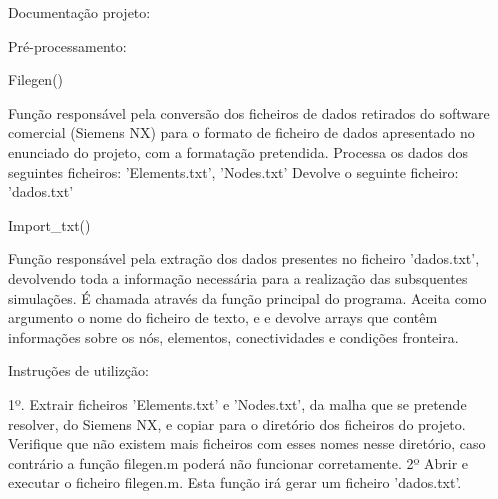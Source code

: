 \documentclass{article}
\begin{document}
Documentação projeto:

Pré-processamento:

Filegen()

    Função responsável pela conversão dos ficheiros de dados retirados do software comercial (Siemens NX) 
    para o formato de ficheiro de dados apresentado no enunciado do projeto, com a formatação pretendida.
    Processa os dados dos seguintes ficheiros: 'Elements.txt', 'Nodes.txt'
    Devolve o seguinte ficheiro: 'dados.txt'

Import_txt()

    Função responsável pela extração dos dados presentes no ficheiro 'dados.txt', devolvendo toda a informação
    necessária para a realização das subsquentes simulações.
    É chamada através da função principal do programa. Aceita como argumento o nome do ficheiro de texto, e
    e devolve arrays que contêm informações sobre os nós, elementos, conectividades e condições fronteira.



Instruções de utilizção:

    1º. Extrair ficheiros 'Elements.txt' e 'Nodes.txt', da malha que se pretende resolver, do Siemens NX, e 
    copiar para o diretório dos ficheiros do projeto. Verifique que não existem mais ficheiros com esses nomes
    nesse diretório, caso contrário a função filegen.m poderá não funcionar corretamente.
    2º Abrir e executar o ficheiro filegen.m. Esta função irá gerar um ficheiro 'dados.txt'.
    
\end{document}
